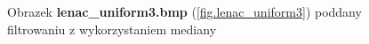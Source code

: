 \documentclass{classrep}
\begin{document}
\begin{figure}
{{  \label{fig.lenac_uniform3_median_5x5}
 }
}
\caption{Obrazek \textbf{lenac\_uniform3.bmp} (\ref{fig.lenac_uniform3}) poddany filtrowaniu z wykorzystaniem mediany}
\label{fig.lenac_uniform3_median}
\end{figure}
\end{document}
